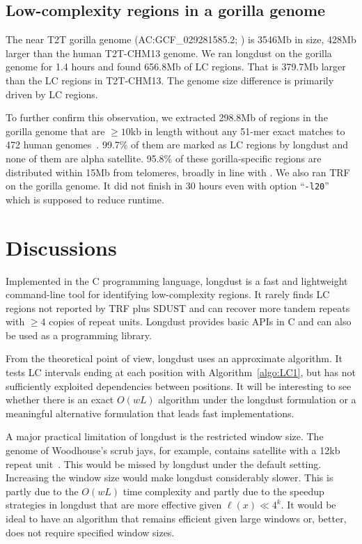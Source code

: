 \documentclass[webpdf,contemporary,large,namedate]{oup-authoring-template}%
\begin{document}
\subsection{Low-complexity regions in a gorilla genome}

The near T2T gorilla genome (AC:GCF\_029281585.2; \citealp{Yoo:2025aa}) is 3546Mb in size, 428Mb larger than the human T2T-CHM13 genome.
We ran longdust on the gorilla genome for 1.4 hours and found 656.8Mb of LC regions.
That is 379.7Mb larger than the LC regions in T2T-CHM13.
The genome size difference is primarily driven by LC regions.

To further confirm this observation,
we extracted 298.8Mb of regions in the gorilla genome that are $\ge10$kb in length without any 51-mer exact matches to 472 human genomes~\citep{Li:2024ac}.
99.7\% of them are marked as LC regions by longdust and none of them are alpha satellite.
95.8\% of these gorilla-specific regions are distributed within 15Mb from telomeres,
broadly in line with \citet{Yoo:2025aa}.
We also ran TRF on the gorilla genome.
It did not finish in 30 hours even with option ``{\tt -l20}'' which is supposed to reduce runtime.

\section{Discussions}

Implemented in the C programming language, longdust is a fast and lightweight command-line tool for
identifying low-complexity regions.
It rarely finds LC regions not reported by TRF plus SDUST
and can recover more tandem repeats with $\ge4$ copies of repeat units.
Longdust provides basic APIs in C and can also be used as a programming library.

From the theoretical point of view, longdust uses an approximate algorithm.
It tests LC intervals ending at each position with Algorithm~\ref{algo:LC1},
but has not sufficiently exploited dependencies between positions.
It will be interesting to see whether there is an exact $O(wL)$ algorithm under the longdust formulation
or a meaningful alternative formulation that leads fast implementations.

A major practical limitation of longdust is the restricted window size.
The genome of Woodhouse's scrub jays, for example, contains satellite with a 12kb repeat unit~\citep{Edwards:2025aa}.
This would be missed by longdust under the default setting.
Increasing the window size would make longdust considerably slower.
This is partly due to the $O(wL)$ time complexity and partly due to the speedup strategies in longdust that are more effective given $\ell(x)\ll 4^k$.
It would be ideal to have an algorithm that remains efficient given large windows or, better, does not require specified window sizes.
\end{document}
